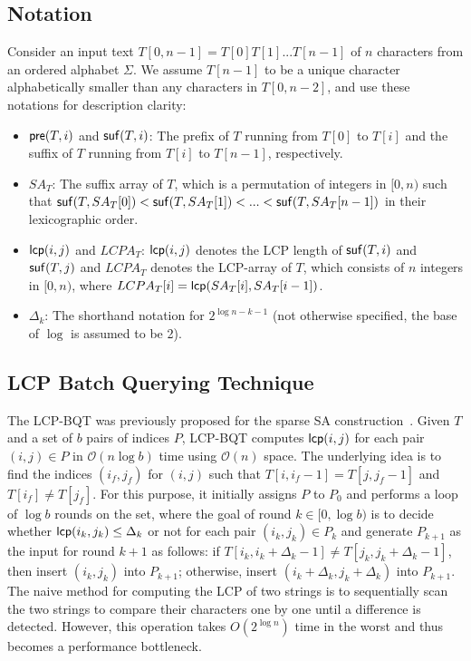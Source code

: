 \documentclass[10pt,journal,letterpaper,compsoc]{IEEEtran}
\begin{document}
\begin{CJK*}{GBK}{song}
\subsection{Notation}\label{subsec:basic_notations}

Consider an input text $T[0,n-1] =T[0]T[1]...T[n-1]$ of $n$ characters from an ordered alphabet $\Sigma$. We assume $T[n-1]$ to be a unique character alphabetically smaller than any characters in $T[0,n-2]$, and use these notations for description clarity:

\begin{itemize}
\item ${\sf pre}(T,i)$ and ${\sf suf}(T,i)$: The prefix of $T$ running from $T[0]$ to $T[i]$ and the suffix of $T$ running from $T[i]$ to $T[n-1]$, respectively.
\item $SA_T$: The suffix array of $T$, which is a permutation of integers in $[0,n)$ such that ${\sf suf}(T,SA_T[0])<{\sf suf}(T,SA_T[1])<...<{\sf suf}(T,SA_T[n-1])$ in their lexicographic order.
\item ${\sf lcp}(i,j)$ and $LCPA_T$: ${\sf lcp}(i,j)$ denotes the LCP length of ${\sf suf}(T,i)$ and ${\sf suf}(T,j)$ and $LCPA_T$ denotes the LCP-array of $T$, which consists of $n$ integers in $[0,n)$, where $LCPA_T[i]= {\sf lcp}(SA_T[i],SA_T[i-1])$.
\item $\Delta_{k}$: The shorthand notation for $2^{\log n - k - 1}$ (not otherwise specified, the base of $\log$ is assumed to be 2).
\end{itemize}

\subsection{LCP Batch Querying Technique}\label{subsec:lcp_batch_querying_technique}

The LCP-BQT was previously proposed for the sparse SA construction~\cite{Philip2013}.
Given $T$ and a set of $b$ pairs of indices $P$, LCP-BQT computes ${\sf lcp}(i,j)$ for each pair $(i,j)\in P$ in $\mathcal{O}(n\log b)$ time using $\mathcal{O}(n)$ space. The underlying idea is to find the indices $(i_{f}, j_{f})$ for $(i,j)$ such that $T[i,i_{f}-1]=T[j,j_{f}-1]$ and $T[i_{f}] \neq T[j_{f}]$. For this purpose, it initially assigns $P$ to $P_0$ and performs a loop of $\log b$ rounds on the set, where the goal of round $k\in [0,\log b)$ is to decide whether ${\sf lcp}(i_k,j_k) \le \Delta_k$ or not for each pair $(i_k,j_k)\in P_k$ and generate $P_{k+1}$ as the input for round $k+1$ as follows: if $T[i_k,i_k+\Delta_k-1] \neq T[j_k,j_k+\Delta_k-1]$, then insert $(i_k,j_k)$ into $P_{k+1}$; otherwise, insert $(i_k+\Delta_k,j_k+\Delta_k)$ into $P_{k+1}$. The naive method for computing the LCP of two strings is to sequentially scan the two strings to compare their characters one by one until a difference is detected. However, this operation takes $O(2^{\log n})$ time in the worst and thus becomes a performance bottleneck.


\end{CJK*}
\end{document}
